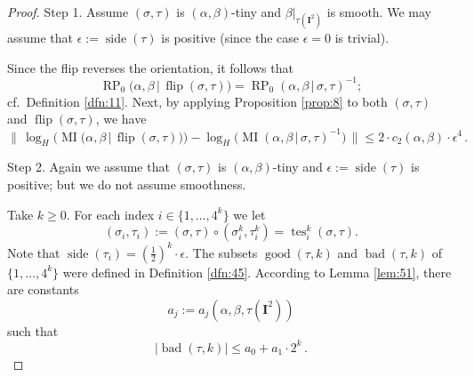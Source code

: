\documentclass[10pt, a4paper]{amsart}
\theoremstyle{definition}
\numberwithin{equation}{section}
\newcommand{\opn}{\operatorname}
\newcommand{\mbf}[1]{\mathbf{#1}}
\newcommand{\smfrac}[2]{{\textstyle \frac{#1}{#2}}}
\newcommand{\Norm}[1]{\bigl\lVert\, #1 \, \bigr\rVert}
\newcommand{\abs}[1]{\lvert #1 \rvert}
\renewcommand{\vert}{\, | \,}
\newcommand{\lb}{\linebreak}
\begin{document}
\begin{proof}
Step 1. Assume $(\sigma, \tau)$ is $(\alpha, \beta)$-tiny and 
$\beta|_{\tau(\mbf{I}^2)}$ is smooth. 
We may assume that $\epsilon := \opn{side}(\tau)$ is positive
(since the case $\epsilon = 0$ is trivial).

Since the flip reverses the orientation, it follows that
\[ \opn{RP}_0  \bigl( \alpha, \beta \vert \opn{flip}(\sigma, \tau) \bigr) =
\opn{RP}_0 ( \alpha, \beta \vert \sigma, \tau)^{-1} ; \]
cf.\ Definition \ref{dfn:11}.
Next, by applying Proposition \ref{prop:8} to both $(\sigma, \tau)$ and \lb
$\opn{flip}(\sigma, \tau)$, we have 
\begin{equation} \label{eqn:182}
\Norm{ \log_H \bigl( 
\opn{MI} \bigl( \alpha, \beta \vert \opn{flip}(\sigma, \tau) \bigr) \bigr)
- \log_H \bigl( 
\opn{MI} (\alpha, \beta \vert \sigma, \tau)^{-1} \bigr) }
\leq 2 \cdot c_2(\alpha, \beta) \cdot \epsilon^4 \, . 
\end{equation}

\medskip \noindent
Step 2. Again we assume that $(\sigma, \tau)$ is $(\alpha, \beta)$-tiny
and $\epsilon := \opn{side}(\tau)$ is positive; but we do not assume smoothness.

Take $k \geq 0$. For each index $i \in \{ 1, \ldots, 4^k \}$ we let
\[ (\sigma_i, \tau_i) := (\sigma, \tau) \circ (\sigma^k_i, \tau^k_i)
= \opn{tes}^k_i (\sigma, \tau) . \]
Note that 
$\opn{side}(\tau_i) = (\smfrac{1}{2})^k \cdot \epsilon$. 
The subsets $\opn{good}(\tau, k)$ and $\opn{bad}(\tau, k)$ of 
$\{ 1, \ldots, 4^k \}$ were defined in Definition \ref{dfn:45}.
According to Lemma \ref{lem:51}, there are constants 
\[ a_j := a_j(\alpha, \beta, \tau(\mbf{I}^2)) \]
such that 
\[ \abs{ \opn{bad}(\tau, k) } \leq a_0 + a_1 \cdot 2^k \, . \]


\end{proof}
\end{document}
